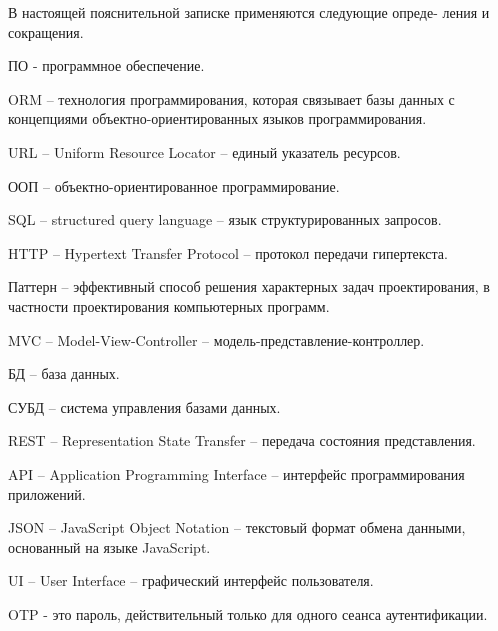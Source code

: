 \thispagestyle{empty}

В настоящей пояснительной записке применяются следующие опреде- ления и сокращения.

ПО - программное обеспечение.

ORM – технология программирования, которая связывает базы данных с концепциями объектно-ориентированных языков программирования.

URL – Uniform Resource Locator – единый указатель ресурсов.

ООП – объектно-ориентированное программирование.

SQL – structured query language – язык структурированных запросов.

HTTP – Hypertext Transfer Protocol – протокол передачи гипертекста.

Паттерн – эффективный способ решения характерных задач проектирования, в частности проектирования компьютерных программ.

MVC – Model-View-Controller – модель-представление-контроллер.

БД – база данных.

СУБД – система управления базами данных.

REST – Representation State Transfer – передача состояния представления.

API – Application Programming Interface – интерфейс программирования приложений.

JSON – JavaScript Object Notation – текстовый формат обмена данными, основанный на языке JavaScript.

UI – User Interface – графический интерфейс пользователя.

OTP - это пароль, действительный только для одного сеанса аутентификации.
